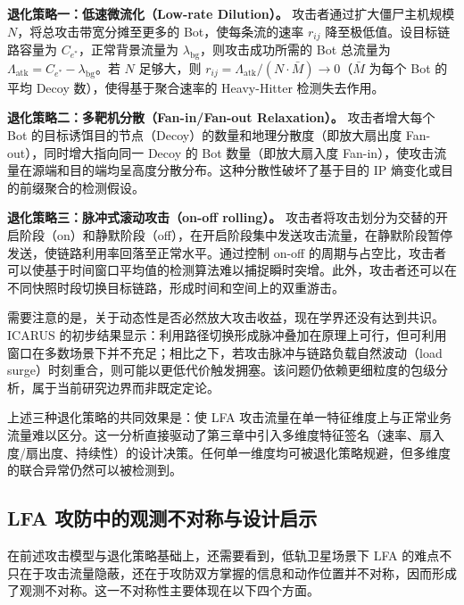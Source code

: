 \textbf{退化策略一：低速微流化（Low-rate Dilution）。} 攻击者通过扩大僵尸主机规模 $N$，将总攻击带宽分摊至更多的 Bot，使每条流的速率 $r_{ij}$ 降至极低值。设目标链路容量为 $C_{e^*}$，正常背景流量为 $\lambda_{\text{bg}}$，则攻击成功所需的 Bot 总流量为 $\Lambda_{\text{atk}} = C_{e^*} - \lambda_{\text{bg}}$。若 $N$ 足够大，则 $r_{ij} = \Lambda_{\text{atk}} / (N \cdot \bar{M}) \to 0$（$\bar{M}$ 为每个 Bot 的平均 Decoy 数），使得基于聚合速率的 Heavy-Hitter 检测失去作用。

\textbf{退化策略二：多靶机分散（Fan-in/Fan-out Relaxation）。} 攻击者增大每个 Bot 的目标诱饵目的节点（Decoy）的数量和地理分散度（即放大扇出度 Fan-out），同时增大指向同一 Decoy 的 Bot 数量（即放大扇入度 Fan-in），使攻击流量在源端和目的端均呈高度分散分布。这种分散性破坏了基于目的 IP 熵变化或目的前缀聚合的检测假设。

\textbf{退化策略三：脉冲式滚动攻击（on-off rolling）。} 攻击者将攻击划分为交替的开启阶段（on）和静默阶段（off），在开启阶段集中发送攻击流量，在静默阶段暂停发送，使链路利用率回落至正常水平。通过控制 on-off 的周期与占空比，攻击者可以使基于时间窗口平均值的检测算法难以捕捉瞬时突增。此外，攻击者还可以在不同快照时段切换目标链路，形成时间和空间上的双重游击。

需要注意的是，关于动态性是否必然放大攻击收益，现在学界还没有达到共识。ICARUS 的初步结果显示：利用路径切换形成脉冲叠加在原理上可行，但可利用窗口在多数场景下并不充足；相比之下，若攻击脉冲与链路负载自然波动（load surge）时刻重合，则可能以更低代价触发拥塞。该问题仍依赖更细粒度的包级分析，属于当前研究边界而非既定定论。

上述三种退化策略的共同效果是：使 LFA 攻击流量在单一特征维度上与正常业务流量难以区分。这一分析直接驱动了第三章中引入多维度特征签名（速率、扇入度/扇出度、持续性）的设计决策。任何单一维度均可被退化策略规避，但多维度的联合异常仍然可以被检测到。


\subsection{LFA 攻防中的观测不对称与设计启示}

在前述攻击模型与退化策略基础上，还需要看到，低轨卫星场景下 LFA 的难点不只在于攻击流量隐蔽，还在于攻防双方掌握的信息和动作位置并不对称，因而形成了观测不对称。这一不对称性主要体现在以下四个方面。

